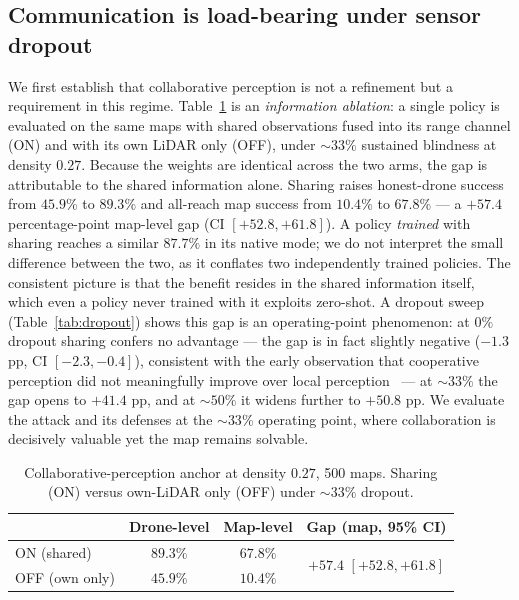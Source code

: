 
\subsection{Communication is load-bearing under sensor dropout}\label{sec:res-anchor}
We first establish that collaborative perception is not a refinement but a
requirement in this regime. Table~\ref{tab:anchor} is an
\emph{information ablation}: a single policy is evaluated on the same maps
with shared observations fused into its range channel (ON) and with its own
LiDAR only (OFF), under $\sim\!33\%$ sustained blindness at density $0.27$.
Because the weights are identical across the two arms, the gap is
attributable to the shared information alone. Sharing raises honest-drone
success from $45.9\%$ to $89.3\%$ and all-reach map success from $10.4\%$
to $67.8\%$ --- a $+57.4$ percentage-point map-level gap
(CI $[+52.8,+61.8]$). A policy \emph{trained} with sharing reaches a
similar $87.7\%$ in its native mode; we do not interpret the small
difference between the two, as it conflates two independently trained
policies. The consistent picture is that the benefit resides in the shared
information itself, which even a policy never trained with it exploits
zero-shot. A dropout sweep (Table~\ref{tab:dropout}) shows this
gap is an operating-point phenomenon: at $0\%$ dropout sharing confers no
advantage --- the gap is in fact slightly negative ($-1.3$ pp,
CI $[-2.3,-0.4]$), consistent with the early observation that cooperative
perception did not meaningfully improve over local
perception~\cite{trupercept2020} --- at $\sim\!33\%$ the gap opens to
$+41.4$ pp, and at $\sim\!50\%$ it widens further to $+50.8$ pp. We evaluate the attack and its defenses at the
$\sim\!33\%$ operating point, where collaboration is decisively valuable yet
the map remains solvable.

\begin{table}[t]\centering
\caption{Collaborative-perception anchor at density $0.27$, 500 maps.
Sharing (ON) versus own-LiDAR only (OFF) under $\sim\!33\%$ dropout.}
\label{tab:anchor}
\begin{tabular}{lccc}
\toprule
 & Drone-level & Map-level & Gap (map, 95\% CI) \\
\midrule
ON (shared)   & $89.3\%$ & $67.8\%$ & \multirow{2}{*}{$+57.4$ $[+52.8,+61.8]$} \\
OFF (own only)& $45.9\%$ & $10.4\%$ & \\
\bottomrule
\end{tabular}
\end{table}

